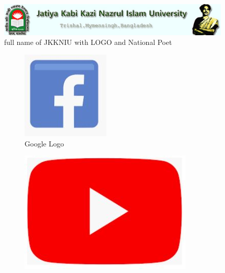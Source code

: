 \documentclass[12pt,a4paper]{article}
\begin{document}
	\begin{figure}
		\includegraphics[width=\textwidth]{JKKNIU}
		\caption{full name of JKKNIU with LOGO and National Poet}
		\label{fig : JKKNIU}
	\end{figure}
	\begin{figure}
		\begin{subfigure}{.5\textwidth}
			\includegraphics[width=\linewidth]{fb}
			\caption{Google Logo}
			\label{fig :Logo1}
		\end{subfigure}
		\begin{subfigure}{.5\textwidth}
			\includegraphics[width=\linewidth]{Youtube}

\end{subfigure}
\end{figure}
\end{document}
